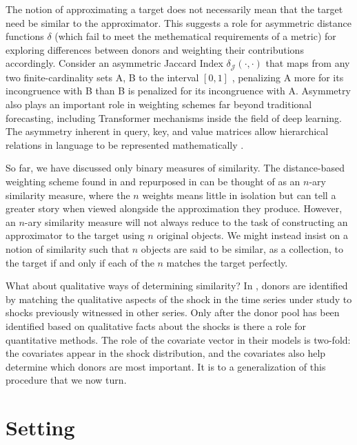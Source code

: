 \documentclass{uiucthesis2021}
\theoremstyle{definition}
\begin{document}
The notion of approximating a target does not necessarily mean that the target need be similar to the approximator.  This suggests a role for asymmetric distance functions $\delta$ (which fail to meet the methematical requirements of a metric) for exploring differences between donors and weighting their contributions accordingly.  Consider an asymmetric Jaccard Index $\delta_{\mathcal{J}}(\cdot,\cdot)$ that maps from any two finite-cardinality sets A, B to the interval $[0,1]$ \citep{garg2015asymmetric}, penalizing A more for its incongruence with B than B is penalized for its incongruence with A.  Asymmetry also plays an important role in weighting schemes far beyond traditional forecasting, including Transformer mechanisms inside the field of deep learning.  The asymmetry inherent in query, key, and value matrices allow hierarchical relations in language to be represented mathematically \citep[p. 364]{bishop2023deep}.  

So far, we have discussed only binary measures of similarity.  The distance-based weighting scheme found in \cite{lin2021minimizing} and repurposed in \cite{lundquist2024volatility} can be thought of as an $n$-ary similarity measure, where the $n$ weights means little in isolation but can tell a greater story when viewed alongside the approximation they produce.  However, an $n$-ary similarity measure will not always reduce to the task of constructing an approximator to the target using $n$ original objects.  We might instead insist on a notion of similarity such that $n$ objects are said to be similar, as a collection, to the target if and only if each of the $n$ matches the target perfectly.

What about qualitative ways of determining similarity?  In \cite{lin2021minimizing, lundquist2024volatility}, donors are identified by matching the qualitative aspects of the shock in the time series under study to shocks previously witnessed in other series.  Only after the donor pool has been identified based on qualitative facts about the shocks is there a role for quantitative methods.  The role of the covariate vector in their models is two-fold: the covariates appear in the shock distribution, and the covariates also help determine which donors are most important.  It is to a generalization of this procedure that we now turn.

\section{Setting}\label{unifying_Setting}
\end{document}
